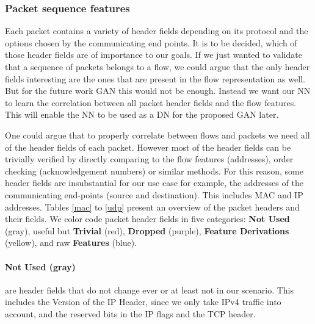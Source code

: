 \documentclass[
	ngerman,
	ruledheaders=section,%
	class=report,%
	thesis={type=bachelor},%
	accentcolor=9c,%
	custommargins=true,%
	marginpar=false,%
	parskip=half-,%
	fontsize=11pt,%
]{tudapub}
\begin{document}
\subsubsection{Packet sequence features}
\label{sec:packtFeatures}


Each packet contains a variety of header fields depending on its protocol and the options chosen by the communicating end points.
It is to be decided, which of those header fields are of importance to our goals.
If we just wanted to validate that a sequence of packets belongs to a flow, we could argue that the only header fields interesting are the ones that are present in the flow representation as well.
But for the future work GAN this would not be enough.
Instead we want our NN to learn the correlation between all packet header fields and the flow features.
This will enable the NN to be used as a DN for the proposed GAN later.

One could argue that to properly correlate between flows and packets we need all of the header fields of each packet.
However most of the header fields can be trivially verified by directly comparing to the flow features (addresses), order checking (acknowledgement numbers) or similar methods.
For this reason, some header fields are insubstantial for our use case for example, the addresses of the communicating end-points (source and destination).
This includes MAC and IP addresses.
Tables \ref{mac} to \ref{udp} present an overview of the packet headers and their fields.
We color code packet header fields in five categories:
\colorbox{not}{\textbf{{Not Used}} (gray)},
useful but \colorbox{trivial}{\textbf{Trivial} (red)},
\colorbox{dropped}{\textbf{Dropped} (purple)},
\colorbox{derivation}{\textbf{Feature Derivations} (yellow)},
and raw \colorbox{feature}{\textbf{Features} (blue)}.

\paragraph{\colorbox{not}{\textbf{{Not Used} (gray)}}} are header fields that do not change ever or at least not in our scenario.
This includes the Version of the IP Header, since we only take IPv4 traffic into account,
and the reserved bits in the IP flags and the TCP header.
\end{document}
